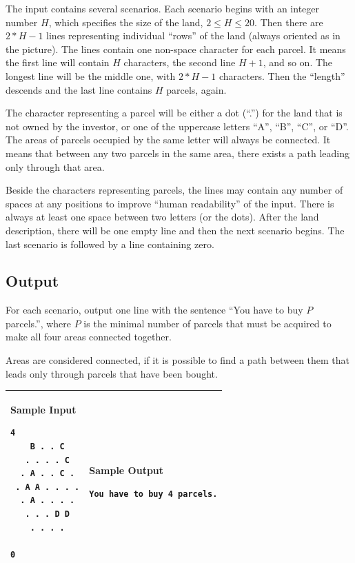 The input contains several scenarios. Each scenario begins with an integer
number $H$, which specifies the size of the land, $2 \leq H \leq 20$. Then there
are $2*H - 1$ lines representing individual ``rows'' of the land (always oriented
as in the picture). The lines contain one non-space character for each parcel.
It means the first line will contain $H$ characters, the second line $H + 1$, and
so on. The longest line will be the middle one, with $2*H - 1$ characters. Then
the ``length'' descends and the last line contains $H$ parcels, again.

The character representing a parcel will be either a dot (``.'') for the land
that is not owned by the investor, or one of the uppercase letters ``A'', ``B'',
``C'', or ``D''. The areas of parcels occupied by the same letter will always
be connected. It means that between any two parcels in the same area, there
exists a path leading only through that area.

Beside the characters representing parcels, the lines may contain any
number of spaces at any positions to improve ``human readability'' of the
input. There is always at least one space between two letters (or the
dots). After the land description, there will be one empty line and
then the next scenario begins. The last scenario is followed by a line
containing zero.

\subsection*{Output}

For each scenario, output one line with the sentence ``You have to buy $P$
parcels.'', where $P$ is the minimal number of parcels that must be acquired to
make all four areas connected together.

Areas are considered connected, if it is possible to find a path between them
that leads only through parcels that have been bought.

\begin{table}[!h]
\centering
\begin{tabular}{|l|l|}
\hline
\begin{minipage}[t]{3in}
\textbf{Sample Input}
\begin{verbatim}
4
    B . . C
   . . . . C
  . A . . C .
 . A A . . . .
  . A . . . .
   . . . D D
    . . . .

0
\end{verbatim}
\vspace{1mm}
\end{minipage}
&

\begin{minipage}[t]{3in}
\textbf{Sample Output}
\begin{verbatim}
You have to buy 4 parcels.
\end{verbatim}
\vspace{1mm}
\end{minipage} \\
\hline
\end{tabular}
\end{table}

\newpage
